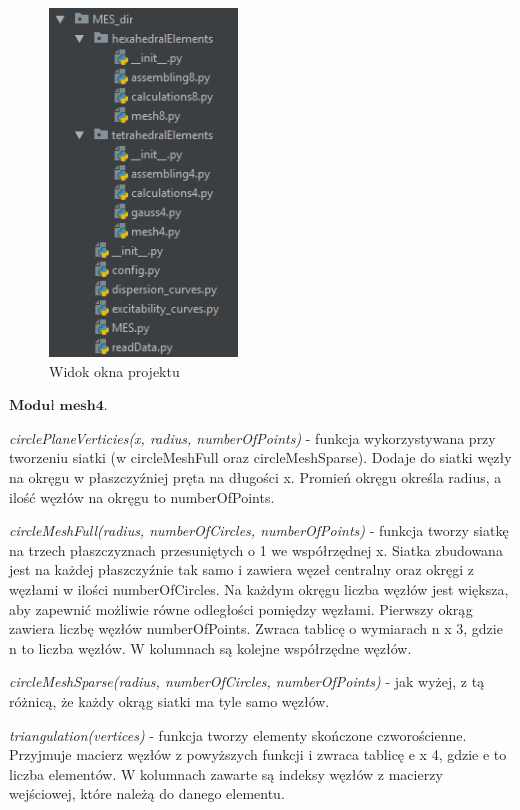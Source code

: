 \begin{figure}[h]
\centering
\includegraphics[width=5cm]{Zdjecia/5/okno_projektu_MES}
\caption{Widok okna projektu}
\label{fig:okno_projektu_MES}
\end{figure}


 \( \textbf{Moduł mesh4} \).

\textit{circlePlaneVerticies(x, radius, numberOfPoints)} - funkcja wykorzystywana przy tworzeniu siatki (w circleMeshFull oraz circleMeshSparse). Dodaje do siatki węzły na okręgu w płaszczyźniej pręta na długości x. Promień okręgu określa radius, a ilość węzłów na okręgu to numberOfPoints.

\textit{circleMeshFull(radius, numberOfCircles, numberOfPoints)} - funkcja tworzy siatkę na trzech płaszczyznach przesuniętych o 1 we współrzędnej x. Siatka zbudowana jest na każdej płaszczyźnie tak samo i zawiera węzeł centralny oraz okręgi z węzłami w ilości numberOfCircles. Na każdym okręgu liczba węzłów jest większa, aby zapewnić możliwie równe odległości pomiędzy węzłami. Pierwszy okrąg zawiera liczbę węzłów numberOfPoints. Zwraca tablicę o wymiarach n x 3, gdzie n to liczba węzłów. W kolumnach są kolejne współrzędne węzłów.

\textit{circleMeshSparse(radius, numberOfCircles, numberOfPoints)} - jak wyżej, z tą różnicą, że każdy okrąg siatki ma tyle samo węzłów.

\textit{triangulation(vertices)} - funkcja tworzy elementy skończone czworościenne. Przyjmuje macierz węzłów z powyższych funkcji i zwraca tablicę e x 4, gdzie e to liczba elementów. W kolumnach zawarte są indeksy węzłów z macierzy wejściowej, które należą do danego elementu.

